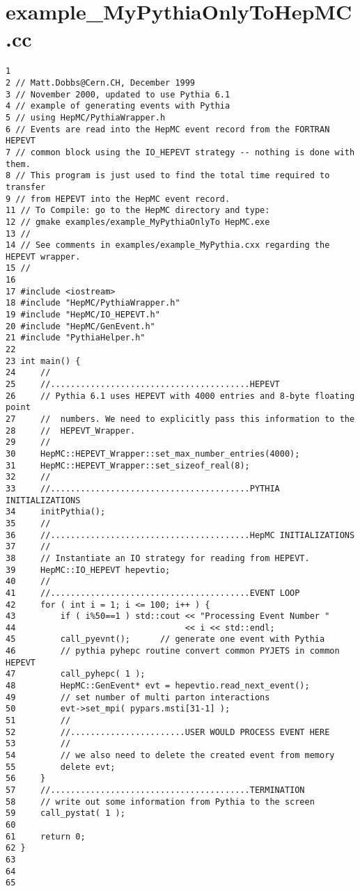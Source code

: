 \section{example\_\-My\-Pythia\-Only\-To\-Hep\-MC.cc}


\begin{DocInclude}\begin{verbatim}1 
2 // Matt.Dobbs@Cern.CH, December 1999
3 // November 2000, updated to use Pythia 6.1
4 // example of generating events with Pythia 
5 // using HepMC/PythiaWrapper.h 
6 // Events are read into the HepMC event record from the FORTRAN HEPEVT 
7 // common block using the IO_HEPEVT strategy -- nothing is done with them.
8 // This program is just used to find the total time required to transfer
9 // from HEPEVT into the HepMC event record.
11 // To Compile: go to the HepMC directory and type:
12 // gmake examples/example_MyPythiaOnlyTo HepMC.exe
13 //
14 // See comments in examples/example_MyPythia.cxx regarding the HEPEVT wrapper.
15 //
16 
17 #include <iostream>
18 #include "HepMC/PythiaWrapper.h"
19 #include "HepMC/IO_HEPEVT.h"
20 #include "HepMC/GenEvent.h"
21 #include "PythiaHelper.h"
22 
23 int main() {    
24     //
25     //........................................HEPEVT
26     // Pythia 6.1 uses HEPEVT with 4000 entries and 8-byte floating point
27     //  numbers. We need to explicitly pass this information to the 
28     //  HEPEVT_Wrapper.
29     //
30     HepMC::HEPEVT_Wrapper::set_max_number_entries(4000);
31     HepMC::HEPEVT_Wrapper::set_sizeof_real(8);
32     //  
33     //........................................PYTHIA INITIALIZATIONS
34     initPythia();
35     //
36     //........................................HepMC INITIALIZATIONS
37     //
38     // Instantiate an IO strategy for reading from HEPEVT.
39     HepMC::IO_HEPEVT hepevtio;
40     //
41     //........................................EVENT LOOP
42     for ( int i = 1; i <= 100; i++ ) {
43         if ( i%50==1 ) std::cout << "Processing Event Number " 
44                                  << i << std::endl;
45         call_pyevnt();      // generate one event with Pythia
46         // pythia pyhepc routine convert common PYJETS in common HEPEVT
47         call_pyhepc( 1 );
48         HepMC::GenEvent* evt = hepevtio.read_next_event();
49         // set number of multi parton interactions
50         evt->set_mpi( pypars.msti[31-1] );
51         //
52         //.......................USER WOULD PROCESS EVENT HERE
53         //
54         // we also need to delete the created event from memory
55         delete evt;
56     }
57     //........................................TERMINATION
58     // write out some information from Pythia to the screen
59     call_pystat( 1 );    
60 
61     return 0;
62 }
63 
64 
65  
\end{verbatim}
\end{DocInclude}
 